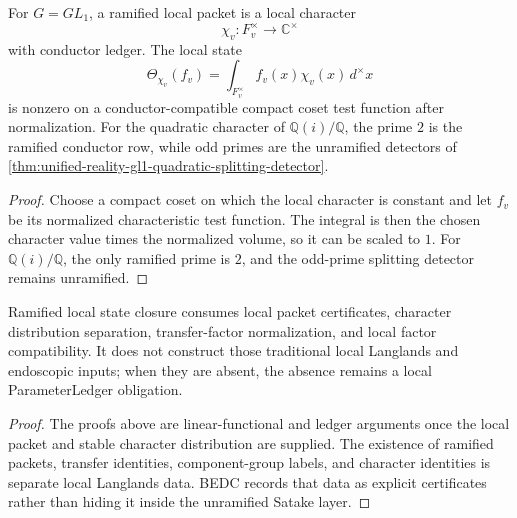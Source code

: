 \begin{corollary}
\label{cor:unified-reality-abelian-ramified-check}
For $G=GL_1$, a ramified local packet is a local character
$$
\chi_v:F_v^\times\to\mathbb C^\times
$$
with conductor ledger. The local state
$$
\Theta_{\chi_v}(f_v)
=
\int_{F_v^\times}f_v(x)\chi_v(x)\,d^\times x
$$
is nonzero on a conductor-compatible compact coset test function after
normalization. For the quadratic character of $\mathbb Q(i)/\mathbb Q$,
the prime $2$ is the ramified conductor row, while odd primes are the
unramified detectors of
\autoref{thm:unified-reality-gl1-quadratic-splitting-detector}.
\end{corollary}
\begin{proof}
Choose a compact coset on which the local character is constant and let
$f_v$ be its normalized characteristic test function. The integral is
then the chosen character value times the normalized volume, so it can
be scaled to $1$. For $\mathbb Q(i)/\mathbb Q$, the only ramified prime
is $2$, and the odd-prime splitting detector remains unramified.
\end{proof}

\begin{theorem}
\label{thm:unified-reality-ramified-local-state-boundary}
Ramified local state closure consumes local packet certificates,
character distribution separation, transfer-factor normalization, and
local factor compatibility. It does not construct those traditional
local Langlands and endoscopic inputs; when they are absent, the absence
remains a local ParameterLedger obligation.
\end{theorem}
\begin{proof}
The proofs above are linear-functional and ledger arguments once the
local packet and stable character distribution are supplied. The
existence of ramified packets, transfer identities, component-group
labels, and character identities is separate local Langlands data. BEDC
records that data as explicit certificates rather than hiding it inside
the unramified Satake layer.
\end{proof}
